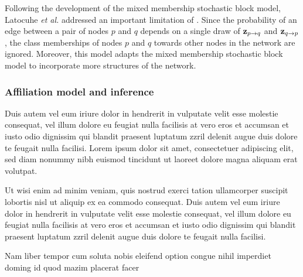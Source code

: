 Following the development of the mixed membership stochastic block model, Latocuhe \emph{et al.} \cite{LA} addressed an important limitation of \cite{mixMember}. Since the probability of an edge between a pair of nodes $p$ and $q$ depends on a single draw of ${\bf z}_{p\rightarrow q}$ and ${\bf z}_{q\rightarrow p}$, the class memberships of nodes $p$ and $q$ towards other nodes in the network are ignored. Moreover, this model adapts the mixed membership stochastic block model to incorporate more structures of the network. 

\subsubsection{Affiliation model and inference}


Duis autem vel eum iriure dolor in hendrerit in vulputate velit esse molestie consequat, vel illum dolore eu feugiat nulla facilisis at vero eros et accumsan et iusto odio dignissim qui blandit praesent luptatum zzril delenit augue duis dolore te feugait nulla facilisi. Lorem ipsum dolor sit amet, consectetuer adipiscing elit, sed diam nonummy nibh euismod tincidunt ut laoreet dolore magna aliquam erat volutpat.   

Ut wisi enim ad minim veniam, quis nostrud exerci tation ullamcorper suscipit lobortis nisl ut aliquip ex ea commodo consequat. Duis autem vel eum iriure dolor in hendrerit in vulputate velit esse molestie consequat, vel illum dolore eu feugiat nulla facilisis at vero eros et accumsan et iusto odio dignissim qui blandit praesent luptatum zzril delenit augue duis dolore te feugait nulla facilisi.   

Nam liber tempor cum soluta nobis eleifend option congue nihil imperdiet doming id quod mazim placerat facer






